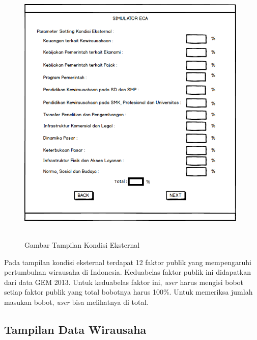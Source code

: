 \begin{figure} [H]
	\centering  
	\includegraphics[width=11cm, height=13cm]{mockup3} 
	\caption[Gambar Tampilan Kondisi Eksternal]{Gambar Tampilan Kondisi Eksternal}
	\label{fig:kondisiEksternal} 
\end{figure}

Pada tampilan kondisi eksternal terdapat 12 faktor publik yang mempengaruhi pertumbuhan wirausaha di Indonesia. Keduabelas faktor publik ini didapatkan dari data GEM 2013. Untuk keduabelas faktor ini, \textit{user} harus mengisi bobot setiap faktor publik yang total bobotnya harus 100\%. Untuk memeriksa jumlah masukan bobot, \textit{user} bisa melihatnya di total. 

\subsection{Tampilan Data Wirausaha}

